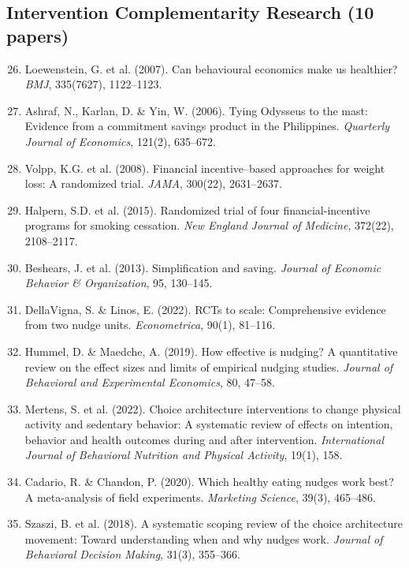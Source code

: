 \subsection{Intervention Complementarity Research (10 papers)}

\begin{enumerate}
    \setcounter{enumi}{25}
    \item Loewenstein, G. et al. (2007). Can behavioural economics make us healthier? \textit{BMJ}, 335(7627), 1122--1123.
    \item Ashraf, N., Karlan, D. \& Yin, W. (2006). Tying Odysseus to the mast: Evidence from a commitment savings product in the Philippines. \textit{Quarterly Journal of Economics}, 121(2), 635--672.
    \item Volpp, K.G. et al. (2008). Financial incentive–based approaches for weight loss: A randomized trial. \textit{JAMA}, 300(22), 2631--2637.
    \item Halpern, S.D. et al. (2015). Randomized trial of four financial-incentive programs for smoking cessation. \textit{New England Journal of Medicine}, 372(22), 2108--2117.
    \item Beshears, J. et al. (2013). Simplification and saving. \textit{Journal of Economic Behavior \& Organization}, 95, 130--145.
    \item DellaVigna, S. \& Linos, E. (2022). RCTs to scale: Comprehensive evidence from two nudge units. \textit{Econometrica}, 90(1), 81--116.
    \item Hummel, D. \& Maedche, A. (2019). How effective is nudging? A quantitative review on the effect sizes and limits of empirical nudging studies. \textit{Journal of Behavioral and Experimental Economics}, 80, 47--58.
    \item Mertens, S. et al. (2022). Choice architecture interventions to change physical activity and sedentary behavior: A systematic review of effects on intention, behavior and health outcomes during and after intervention. \textit{International Journal of Behavioral Nutrition and Physical Activity}, 19(1), 158.
    \item Cadario, R. \& Chandon, P. (2020). Which healthy eating nudges work best? A meta-analysis of field experiments. \textit{Marketing Science}, 39(3), 465--486.
    \item Szaszi, B. et al. (2018). A systematic scoping review of the choice architecture movement: Toward understanding when and why nudges work. \textit{Journal of Behavioral Decision Making}, 31(3), 355--366.
\end{enumerate}

